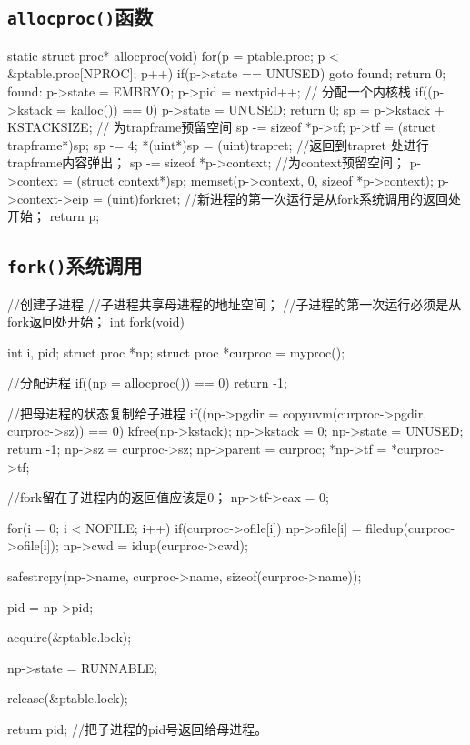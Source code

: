 \documentclass{swfuthesism}
\begin{document}
\subsection{\texttt{allocproc()}函数}
\label{sec:allocproc}

\begin{ccode}
static struct proc* allocproc(void)
{  
  for(p = ptable.proc; p < &ptable.proc[NPROC]; p++)
    if(p->state == UNUSED)
      goto found;
  return 0;
found:
  p->state = EMBRYO;
  p->pid = nextpid++;
  // 分配一个内核栈
  if((p->kstack = kalloc()) == 0){
    p->state = UNUSED;
    return 0;
  }
  sp = p->kstack + KSTACKSIZE;
  // 为trapframe预留空间
  sp -= sizeof *p->tf;
  p->tf = (struct trapframe*)sp;
  sp -= 4;
  *(uint*)sp = (uint)trapret; //返回到trapret 处进行trapframe内容弹出；
  sp -= sizeof *p->context; //为context预留空间；
  p->context = (struct context*)sp;
  memset(p->context, 0, sizeof *p->context);
  p->context->eip = (uint)forkret; //新进程的第一次运行是从fork系统调用的返回处开始；
  return p;
}
\end{ccode}

\subsection{\texttt{fork()}系统调用}
\label{sec:fork}

\begin{ccode}
//创建子进程
//子进程共享母进程的地址空间；
//子进程的第一次运行必须是从fork返回处开始；
int fork(void){
  int i, pid;
  struct proc *np;
  struct proc *curproc = myproc();

  //分配进程
  if((np = allocproc()) == 0){
    return -1;
  }

  //把母进程的状态复制给子进程
  if((np->pgdir = copyuvm(curproc->pgdir, curproc->sz)) == 0){
    kfree(np->kstack);
    np->kstack = 0;
    np->state = UNUSED;
    return -1;
  }
  np->sz = curproc->sz;
  np->parent = curproc;
  *np->tf = *curproc->tf;

  //fork留在子进程内的返回值应该是0；
  np->tf->eax = 0;

  for(i = 0; i < NOFILE; i++)
    if(curproc->ofile[i])
      np->ofile[i] = filedup(curproc->ofile[i]);
  np->cwd = idup(curproc->cwd);

  safestrcpy(np->name, curproc->name, sizeof(curproc->name));

  pid = np->pid;

  acquire(&ptable.lock);

  np->state = RUNNABLE;

  release(&ptable.lock);

  return pid; //把子进程的pid号返回给母进程。
}
\end{ccode}
\end{document}
